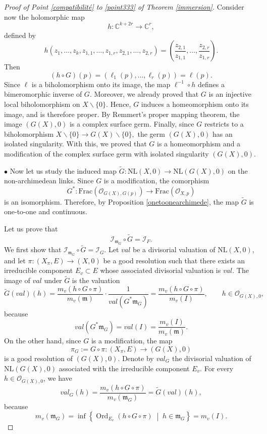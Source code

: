 \documentclass[reqno,dvipsnames,12pt]{amsart}
\renewcommand{\setminus}{\smallsetminus}
\begin{document}
\begin{proof}[Proof of Point \ref{compatibilité} to \ref{point333} of Theorem \ref{immersion}]
Consider now the holomorphic map
\[
h:\mathbb{C}^{k+2r} \longrightarrow \mathbb{C}^r,
\]
defined by
\[
h(z_1,\dots,z_k,z_{1,1},\dots,z_{1,r},z_{2,1},\dots,z_{2,r})
=
\left(
\frac{z_{2,1}}{z_{1,1}},
\dots,
\frac{z_{2,r}}{z_{1,r}}
\right).
\]
Then
\[
(h \circ G)(p)
=
(\ell_1(p),\dots,\ell_r(p))
=
\ell(p).
\]
Since $\ell$ is a biholomorphism onto its image, the map $\ell^{-1}\circ h$
defines a bimeromorphic inverse of $G$. Moreover, we already proved that $G$ is an injective local biholomorphism on $X \setminus \{0\}$. Hence, $G$ induces a homeomorphism onto its image, and is therefore proper. By Remmert's proper mapping theorem, the image $(G(X),0)$ is a complex surface germ. Finally, since $G$ restricts to a biholomorphism $X \setminus \{0\}
\longrightarrow
G(X)\setminus \{0\},$
the germ $(G(X),0)$ has an isolated singularity. With this, we proved that $G$ is a homeomorphism and a modification of the complex surface germ with isolated singularity $(G(X),0)$.


$\bullet$ Now let us study the induced map $\widetilde{G}:\mathrm{NL}(X,0)\longrightarrow \mathrm{NL}(G(X),0) $
on the non-archimedean links. Since \(G\) is a modification, the comorphism
\[
G^*:\mathrm{Frac}(\mathcal{O}_{G(X),G(p)})\longrightarrow \mathrm{Frac}(\mathcal{O}_{X,p})
\]
is an isomorphism. Therefore, by Proposition \ref{onetoonearchimede}, the map \(\widetilde{G}\) is one-to-one and continuous.

Let us prove that
\[
\mathcal{I}_{\mathfrak{m}_{G}}\circ \widetilde{G}=\mathcal{I}_{F}.
\]
We first show that $\mathcal{I}_{\mathfrak{m}_{G}}\circ \widetilde{G}=\mathcal{I}_{G}.$ Let \(val\) be a divisorial valuation of \(\mathrm{NL}(X,0)\), and let $\pi:(X_{\pi},E)\longrightarrow (X,0)$ be a good resolution such that there exists an irreducible component \(E_v\subset E\) whose associated divisorial valuation is \(val\). The image of \(val\) under \(\widetilde{G}\) is the valuation
\[
\widetilde{G}(val)(h)
=
\frac{m_v(h\circ G\circ \pi)}{m_v(\mathfrak m)}
\cdot
\frac{1}{val(G^*\mathfrak m_G)}
=
\frac{m_v(h\circ G\circ \pi)}{m_v(I)},
\qquad h\in \mathcal{O}_{G(X),0},
\]
because
\[
val(G^*\mathfrak m_G)
=
val(I)
=
\frac{m_v(I)}{m_v(\mathfrak m)}.
\]On the other hand, since \(G\) is a modification, the map
\[
\pi_G:=G\circ \pi:(X_{\pi},E)\longrightarrow (G(X),0)
\]
is a good resolution of \((G(X),0)\). Denote by \(val_G\) the divisorial valuation of \(\mathrm{NL}(G(X),0)\) associated with the irreducible component \(E_v\). For every \(h\in \mathcal{O}_{G(X),0}\), we have
\begin{equation}\label{13003}
val_G(h)
=
\frac{m_v(h\circ G\circ \pi)}{m_v(\mathfrak m_G)}
=
\widetilde{G}(val)(h),
\end{equation}
because
\begin{equation}\label{13000}
m_v(\mathfrak m_G)
=
\inf \left\{
\operatorname{Ord}_{E_v}(h\circ G\circ \pi)
\;\middle|\;
h\in \mathfrak m_G
\right\}
=
m_v(I).
\end{equation}


\end{proof}
\end{document}
